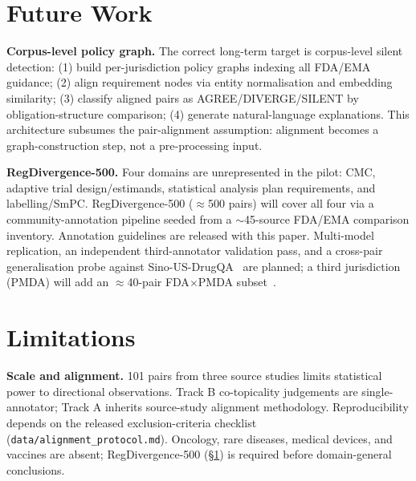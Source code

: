 \documentclass[manuscript]{acmart}
\begin{document}
\section{Future Work}
\label{sec:futurework}

\textbf{Corpus-level policy graph.}
The correct long-term target is corpus-level silent detection: (1) build
per-jurisdiction policy graphs indexing all FDA/EMA guidance; (2) align
requirement nodes via entity normalisation and embedding similarity; (3)
classify aligned pairs as AGREE/DIVERGE/SILENT by obligation-structure
comparison; (4) generate natural-language explanations. This architecture
subsumes the pair-alignment assumption: alignment becomes a graph-construction
step, not a pre-processing input.

\textbf{RegDivergence-500.}
Four domains are unrepresented in the pilot: CMC, adaptive trial
design/estimands, statistical analysis plan requirements, and labelling/SmPC.
RegDivergence-500 ($\approx$500 pairs) will cover all four via a
community-annotation pipeline seeded from a $\sim$45-source FDA/EMA comparison
inventory. Annotation guidelines are released with this paper. Multi-model
replication, an independent third-annotator validation pass, and a cross-pair
generalisation probe against Sino-US-DrugQA~\cite{sinousdrugqa2026} are
planned; a third jurisdiction (PMDA) will add an
$\approx$40-pair FDA$\times$PMDA subset~\cite{mita2026doses,gomezfernandez2026inhibitors}.

\section{Limitations}
\label{sec:limitations}

\textbf{Scale and alignment.} 101 pairs from three source studies limits
statistical power to directional observations. Track B co-topicality judgements
are single-annotator; Track A inherits source-study alignment methodology.
Reproducibility depends on the released exclusion-criteria checklist
(\texttt{data/alignment\_protocol.md}). Oncology, rare diseases, medical
devices, and vaccines are absent; RegDivergence-500 (\S\ref{sec:futurework})
is required before domain-general conclusions.
\end{document}
